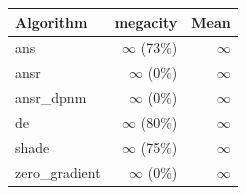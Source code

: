 \begin{tabular}{lrr}
\toprule
Algorithm & megacity & Mean \\
\midrule
ans & $\infty$ (73\%) & $\infty$ \\
ansr & $\infty$ (0\%) & $\infty$ \\
ansr\_dpnm & $\infty$ (0\%) & $\infty$ \\
de & $\infty$ (80\%) & $\infty$ \\
shade & $\infty$ (75\%) & $\infty$ \\
zero\_gradient & $\infty$ (0\%) & $\infty$ \\
\bottomrule
\end{tabular}

